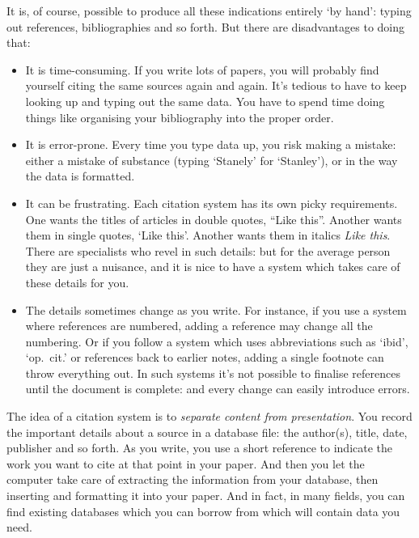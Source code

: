 It is, of course, possible to produce all these indications entirely
`by hand': typing out references, bibliographies and so forth. But
there are disadvantages to doing that:
\begin{itemize}
\item It is time-consuming. If you write lots of papers, you will
  probably find yourself citing the same sources again and again. It's
  tedious to have to keep looking up and typing out the same data. You
  have to spend time doing things like organising your bibliography
  into the proper order.
\item It is error-prone. Every time you type data up, you risk making
  a mistake: either a mistake of substance (typing `Stanely' for
  `Stanley'), or in the way the data is formatted.
\item It can be frustrating. Each citation system has its own picky
  requirements. One wants the titles of articles in double quotes,
  ``Like this''. Another wants them in single quotes, `Like
  this'. Another wants them in italics \emph{Like this}. There are
  specialists who revel in such details: but for the average person
  they are just a nuisance, and it is nice to have a system which
  takes care of these details for you.
\item The details sometimes change as you write. For instance, if you
  use a system where references are numbered, adding a reference may
  change all the numbering. Or if you follow a system which uses
  abbreviations such as `ibid', `op.\ cit.' or references back to
  earlier notes, adding a single footnote can throw everything out. In
  such systems it's not possible to finalise references until the
  document is complete: and every change can easily introduce errors.
\end{itemize}

The idea of a citation system is to \emph{separate content from
  presentation}. 
You record the important details about a source in a
database file: the author(s), title, date, publisher and so forth. As
you write, you use a short reference to indicate the work you want to
cite at that point in your paper. And then you let the computer take
care of extracting the information from your database, then inserting
and formatting it into your paper. And in fact, in many fields, you
can find existing databases which you can borrow from which will
contain data you need.

